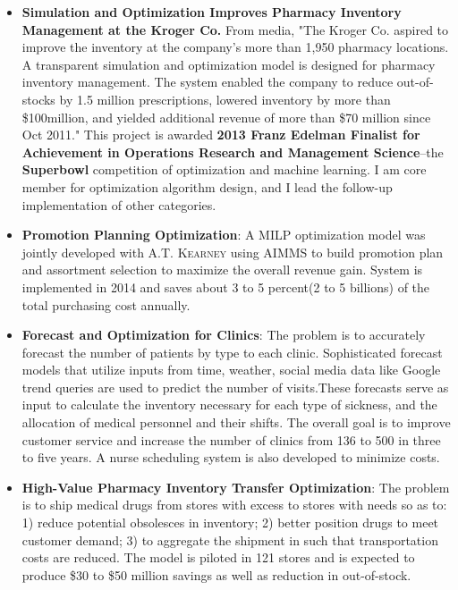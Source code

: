 \documentclass[12pt,letterpaper,roman]{moderncv} %
\begin{document}
{} %
{

\begin{itemize}


\item \textbf{Simulation and Optimization Improves Pharmacy Inventory Management at the Kroger Co.} From media, "The Kroger Co. aspired to improve the inventory at the company's more than 1,950 pharmacy locations. A transparent simulation and optimization model is designed for pharmacy inventory management. The system enabled the company to reduce out-of-stocks by 1.5 million prescriptions, lowered inventory by more than \$100million, and yielded additional revenue of more than \$70 million since Oct 2011." This project is awarded \textbf{2013 Franz Edelman Finalist for Achievement in Operations Research and Management Science}--the \textbf{Superbowl} competition of optimization and machine learning. I am core member for optimization algorithm design, and I lead the follow-up implementation of other categories.
\item \textbf{Promotion Planning Optimization}: A MILP optimization model was
jointly developed with \textsc{A.T. Kearney} using AIMMS to build promotion plan and
assortment selection to maximize the overall revenue gain. System is
implemented in 2014 and saves about 3 to 5 percent(2 to 5 billions) of the total purchasing cost annually.
\item \textbf{Forecast and Optimization for Clinics}: The problem is
to accurately forecast the number of patients by type to each clinic.
Sophisticated forecast models that utilize inputs from time, weather, social
media data like Google trend queries are used to predict the number of
visits.These forecasts serve as input to calculate the inventory necessary for
each type of sickness, and the allocation of medical personnel and their
shifts. The overall goal is to improve customer service and increase the number
of clinics from 136 to 500 in three to five years. A nurse scheduling system is also developed to minimize costs.
\item \textbf{High-Value Pharmacy Inventory Transfer Optimization}:  The problem is to ship 
medical drugs from stores with excess to stores with needs so as to: 1) reduce
potential obsolesces in inventory; 2) better position drugs to meet customer
demand; 3) to aggregate the shipment in such that transportation costs are
reduced. The model is piloted in 121 stores and is expected
to produce \$30 to \$50 million savings as well as reduction in
out-of-stock.
 

\end{itemize}}
\end{document}
